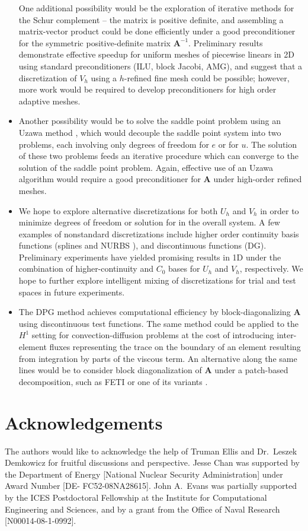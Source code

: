 \documentclass[final,leqno]{siamltex}
\newcommand{\bs}[1]{\boldsymbol{#1}}
\begin{document}
\begin{itemize}
One additional possibility would be the exploration of iterative methods for the Schur complement -- the matrix is positive definite, and assembling a matrix-vector product could be done efficiently under a good preconditioner for the symmetric positive-definite matrix $\bs{A}^{-1}$.  Preliminary results demonstrate effective speedup for uniform meshes of piecewise linears in 2D using standard preconditioners (ILU, block Jacobi, AMG), and suggest that a discretization of $V_h$ using a $h$-refined fine mesh could be possible; however, more work would be required to develop preconditioners for high order adaptive meshes.  
\item Another possibility would be to solve the saddle point problem using an Uzawa method \cite{uzawa}, which would decouple the saddle point system into two problems, each involving only degrees of freedom for $e$ or for $u$.  The solution of these two problems feeds an iterative procedure which can converge to the solution of the saddle point problem.  Again, effective use of an Uzawa algorithm would require a good preconditioner for $\bs{A}$ under high-order refined meshes.
\item We hope to explore alternative discretizations for both $U_h$ and $V_h$ in order to minimize degrees of freedom or solution for in the overall system.  A few examples of nonstandard discretizations include higher order continuity basis functions (splines and NURBS \cite{NURBSorig}), and discontinuous functions (DG).  Preliminary experiments have yielded promising results in 1D under the combination of higher-continuity and $C_0$ bases for $U_h$ and $V_h$, respectively.  We hope to further explore intelligent mixing of discretizations for trial and test spaces in future experiments.  
\item The DPG method achieves computational efficiency by block-diagonalizing $\bs{A}$ using discontinuous test functions.  The same method could be applied to the $H^1$ setting for convection-diffusion problems at the cost of introducing inter-element fluxes representing the trace on the boundary of an element resulting from integration by parts of the viscous term.  An alternative along the same lines would be to consider block diagonalization of $\bs{A}$ under a patch-based decomposition, such as FETI or one of its variants \cite{FETI1,FETI2}.  
\end{itemize}

\section{Acknowledgements}

The authors would like to acknowledge the help of Truman Ellis and Dr.\ Leszek Demkowicz for fruitful discussions and perspective.  Jesse Chan was supported by the Department of Energy [National Nuclear Security Administration] under Award Number [DE- FC52-08NA28615].  John A.\ Evans was partially supported by the ICES Postdoctoral Fellowship at the Institute for Computational Engineering and Sciences, and by a grant from the Office of Naval Research [N00014-08-1-0992].



\end{document}
